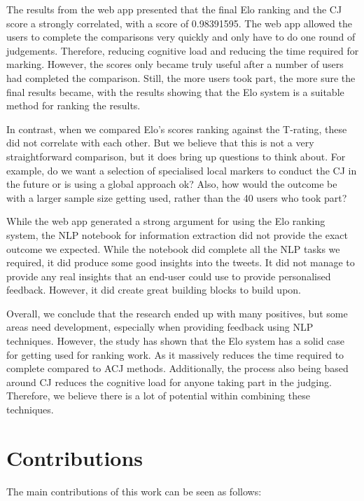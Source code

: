The results from the web app presented that the final Elo ranking and the CJ score a strongly correlated, with a score of 0.98391595. The web app allowed the users to complete the comparisons very quickly and only have to do one round of judgements. Therefore, reducing cognitive load and reducing the time required for marking. However, the scores only became truly useful after a number of users had completed the comparison. Still, the more users took part, the more sure the final results became, with the results showing that the Elo system is a suitable method for ranking the results.

In contrast, when we compared Elo's scores ranking against the T-rating, these did not correlate with each other. But we believe that this is not a very straightforward comparison, but it does bring up questions to think about. For example, do we want a selection of specialised local markers to conduct the CJ in the future or is using a global approach ok? Also, how would the outcome be with a larger sample size getting used, rather than the 40 users who took part?

While the web app generated a strong argument for using the Elo ranking system, the NLP notebook for information extraction did not provide the exact outcome we expected. While the notebook did complete all the NLP tasks we required, it did produce some good insights into the tweets. It did not manage to provide any real insights that an end-user could use to provide personalised feedback. However, it did create great building blocks to build upon.

Overall, we conclude that the research ended up with many positives, but some areas need development, especially when providing feedback using NLP techniques. However, the study has shown that the Elo system has a solid case for getting used for ranking work. As it massively reduces the time required to complete compared to ACJ methods. Additionally, the process also being based around CJ reduces the cognitive load for anyone taking part in the judging. Therefore, we believe there is a lot of potential within combining these techniques.

\section{Contributions} 
	\label{sec:conclusion_cont}
	
	The main contributions of this work can be seen as follows:
	
